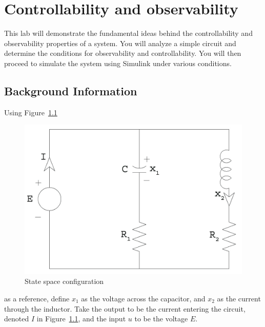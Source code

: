 \chapter{Controllability and observability}\label{chap:controlandobserve}

This lab will demonstrate the fundamental ideas behind the controllability
and observability properties of a system.  You will analyze a simple circuit
and determine the conditions for observability and controllability.  You will
then proceed to simulate the system using \textsf{Simulink} under various
conditions.

\section{Background Information}

Using Figure~\ref{fig:circuit}
\begin{figure}[htbp]
    \centering
    \includegraphics[width=0.6\hsize]{pix/circuitlarge.jpg}
    \caption{State space configuration}\label{fig:circuit}
\end{figure}
as a reference, define \(x_{1}\) as the voltage across the capacitor, and
\(x_{2}\) as the current through the inductor.  Take the output to be the
current entering the circuit, denoted \(I\) in Figure~\ref{fig:circuit}, and the input \(u\) to be the voltage \(E\).

